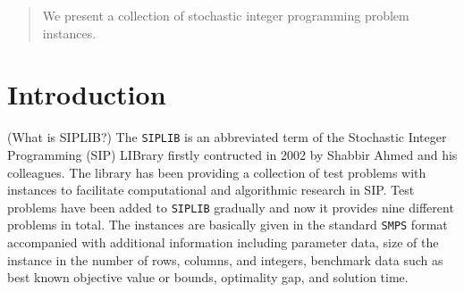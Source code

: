 \author{Yongkyu Cho \and 
		Kibaek Kim \and
        Cong Han Lim \and
        James Luedtke \and
        Jeffrey Linderoth
}



\date{Received: date / Accepted: date}


\maketitle

\begin{abstract}
We present a collection of stochastic integer programming problem instances.
\end{abstract}

\section{Introduction}
(What is SIPLIB?) The \texttt{SIPLIB} \cite{web:SIPLIB1} is an abbreviated term of the Stochastic Integer Programming (SIP) LIBrary firstly contructed in 2002 by Shabbir Ahmed and his colleagues. The library has been providing a collection of test problems with instances to facilitate computational and algorithmic research in SIP. Test problems have been added to \texttt{SIPLIB} gradually and now it provides nine different problems in total.  The instances are basically given in the standard \texttt{SMPS} format accompanied with additional information including parameter data, size of the instance in the number of rows, columns, and integers, benchmark data such as best known objective value or bounds, optimality gap, and solution time.

